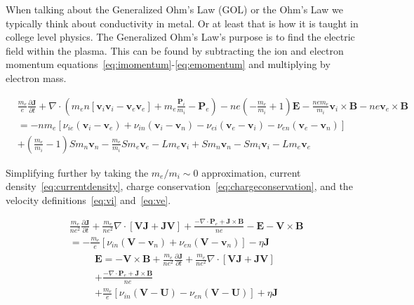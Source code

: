 \documentclass[12pt,upcase]{umlthesis}
\begin{document}
When talking about the Generalized Ohm's Law (GOL) or the Ohm's Law we typically think about conductivity in metal. Or at least that is how it is taught in college level physics. The Generalized Ohm's Law's purpose is to find the electric field within the plasma. This can be found by subtracting the ion and electron momentum equations~\ref{eq:imomentum}-\ref{eq:emomentum} and multiplying by electron mass.

\begin{equation}
\begin{aligned}
	&\frac{m_e}{e}\frac{\partial \textbf{J}}{\partial t} + \nabla \cdot (m_e n [\textbf{v}_i \textbf{v}_i - \textbf{v}_e \textbf{v}_e] +m_e \frac{\textbf{P}_i}{m_i} - \textbf{P}_e) - n e (-\frac{m_e}{m_i}+1) \textbf{E} - \frac{n e m_e}{m_i} \textbf{v}_i \times \textbf{B} - n e\textbf{v}_e \times \textbf{B} \\
	&= -n m_e [ \nu_{ie} (\textbf{v}_i -\textbf{v}_e) + \nu_{in} (\textbf{v}_i -\textbf{v}_n) - \nu_{ei} (\textbf{v}_e -\textbf{v}_i) - \nu_{en} (\textbf{v}_e -\textbf{v}_n)] \\
	&+ (\frac{m_e}{m_i} - 1) S m_n \textbf{v}_n - \frac{m_e}{m_i} S m_e \textbf{v}_e - L m_e \textbf{v}_i + S m_n \textbf{v}_n - S m_i \textbf{v}_i - L m_e \textbf{v}_e
\end{aligned}
\end{equation}

Simplifying further by taking the $m_e/m_i \sim 0$ approximation, current density~\ref{eq:currentdensity}, charge conservation~\ref{eq:chargeconservation}, and the velocity definitions~\ref{eq:vi} and~\ref{eq:ve}.

\begin{equation}
\begin{aligned}
	&\frac{m_e}{n e^2} \frac{\partial\textbf{J}}{\partial t}+ \frac{m_e}{ne^2} \nabla\cdot[\textbf{V}\textbf{J} + \textbf{J}\textbf{V}] + \frac{-\nabla\cdot\textbf{P}_e + \textbf{J}\times\textbf{B}}{ne}- \textbf{E} - \textbf{V}\times\textbf{B} \\
	& = - \frac{m_e}{e}[\nu_{in} (\textbf{V}-\textbf{v}_n) + \nu_{en}(\textbf{V} - \textbf{v}_n)] - \eta\textbf{J}
\end{aligned}
\end{equation}
\begin{equation}\label{eq:gom}
\begin{aligned}
	&\textbf{E}  = - \textbf{V}\times\textbf{B} + \frac{m_e}{n e^2} \frac{\partial\textbf{J}}{\partial t}+ \frac{m_e}{ne^2} \nabla\cdot[\textbf{V}\textbf{J} + \textbf{J}\textbf{V}] \\
	&+ \frac{-\nabla\cdot\textbf{P}_e + \textbf{J}\times\textbf{B}}{ne} \\
	&  + \frac{m_e}{e}[\nu_{in} (\textbf{V}-\textbf{U}) - \nu_{en}(\textbf{V} - \textbf{U})] + \eta\textbf{J}
\end{aligned}
\end{equation}
\end{document}
